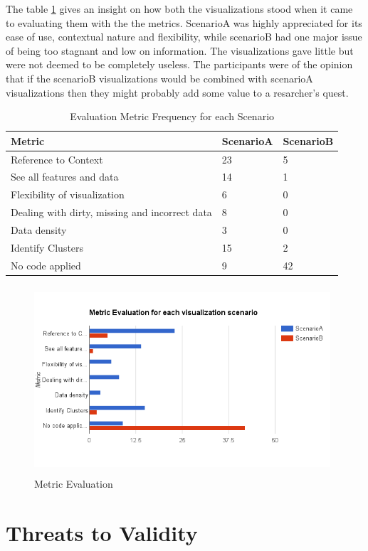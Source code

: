 \documentclass[seploa]{beavtex}
\begin{document}
The table \ref{tab:freq} gives an insight on how both the visualizations stood when it came to evaluating them with the the metrics. ScenarioA was highly appreciated for its ease of use, contextual nature and flexibility, while scenarioB had one major issue of being too stagnant and low on information. The visualizations gave little but were not deemed to be completely useless. The participants were of the opinion that if the scenarioB visualizations would be combined with scenarioA visualizations then they might probably add some value to a resarcher's quest.

\begin{table}[H]
\centering
\begin{tabular}{ |p{5cm}|p{3cm}|p{3cm}|  }
 \hline
Metric & ScenarioA & ScenarioB\\
 \hline
 Reference to Context & 23 & 5\\ \hline
 See all features and data & 14 & 1\\ \hline
 Flexibility of visualization & 6 & 0\\ \hline
 Dealing with dirty, missing and incorrect data & 8 & 0\\ \hline
 Data density & 3 & 0\\ \hline
 Identify Clusters & 15 & 2\\ \hline
 No code applied & 9 & 42\\ 
 \hline
\end{tabular}
\caption{Evaluation Metric Frequency for each Scenario}
\label{tab:freq}
\end{table}

\begin{figure}[!ht]
\centering
\includegraphics[width=110mm,height=70mm]{metric.png}
\caption{Metric Evaluation}
\end{figure}

\chapter{Threats to Validity}
\end{document}
